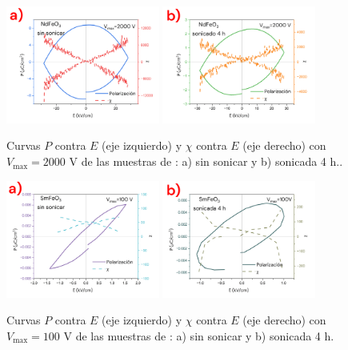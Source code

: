 \documentclass[../main.tex]{subfiles}
\begin{document}
\begin{figure}[H]
    \centering
    \includegraphics[width=0.45\textwidth]{fig/PENdFeO32000V.png}
    \quad
    \includegraphics[width=0.45\textwidth]{fig/PENdFeO3-S2000V.png}
    \caption{Curvas $P$ contra $E$ (eje izquierdo) y $\chi$ contra $E$ (eje derecho) con $V_\text{max}=2000$ V de las muestras de \neod{}: a) sin sonicar y b) sonicada 4 h..}
    \label{fig:nd2000v}
\end{figure}
\begin{figure}[H]
    \centering
    \includegraphics[width=0.45\textwidth]{fig/PESmFeO3100V.png}
    \quad
    \includegraphics[width=0.45\textwidth]{fig/PESmFeO3-S100V.png}
    \caption{Curvas $P$ contra $E$ (eje izquierdo) y $\chi$ contra $E$ (eje derecho) con $V_\text{max}=100$ V de las muestras de \sama{}: a) sin sonicar y b) sonicada 4 h.}
    \label{fig:sm100v}
\end{figure}
\end{document}
